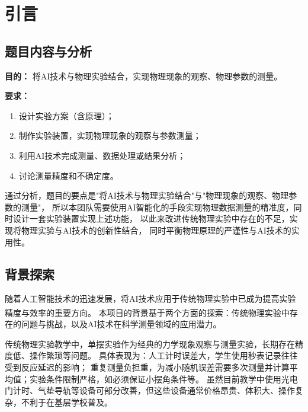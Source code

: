 \section{引言}

\subsection{题目内容与分析}

  \begin{MainBox}[题目6:AI+物理实验]
    \textbf{目的：} 
    将AI技术与物理实验结合，实现物理现象的观察、物理参数的测量。

    \vspace{0.3cm}
    \textbf{要求：}
    \begin{enumerate}[leftmargin=*,nosep,label=\color{winered}\textbf{\arabic*.}]
        \item 设计实验方案（含原理）；
        \item 制作实验装置，实现物理现象的观察与参数测量；
        \item 利用AI技术完成测量、数据处理或结果分析；  
        \item 讨论测量精度和不确定度。
    \end{enumerate}
  \end{MainBox}

通过分析，题目的要点是"将AI技术与物理实验结合"与"物理现象的观察、物理参数的测量"，
所以本团队需要使用AI智能化的手段实现物理数据测量的精准度，同时设计一套实验装置实现上述功能，
以此来改进传统物理实验中存在的不足，实现将物理实验与AI技术的创新性结合，
同时平衡物理原理的严谨性与AI技术的实用性。

\subsection{背景探索}

随着人工智能技术的迅速发展，将AI技术应用于传统物理实验中已成为提高实验精度与效率的重要方向\textsuperscript{\cite{陈冲2025物理引导的深度学习研究综述}}。
本项目的背景基于两个方面的探索：传统物理实验中存在的问题与挑战，以及AI技术在科学测量领域的应用潜力。

传统物理实验教学中，单摆实验作为经典的力学现象观察与测量实验，长期存在精度低、操作繁琐等问题。
具体表现为：人工计时误差大，学生使用秒表记录往往受到反应延迟的影响；
重复测量负担重，为减小随机误差需要多次测量并计算平均值；实验条件限制严格，如必须保证小摆角条件等。
虽然目前教学中使用光电门计时、气垫导轨等设备可部分改善，但这些设备通常价格昂贵、体积大、操作复杂，不利于在基层学校普及。

